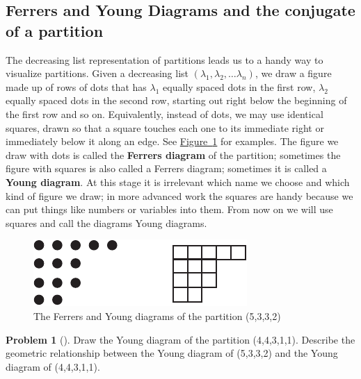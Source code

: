 \documentclass[10pt,]{book}
\newcommand{\terminology}[1]{\textbf{#1}}
\theoremstyle{plain}
\theoremstyle{definition}
\newtheorem{activity}[project]{Problem}
\theoremstyle{definition}
\numberwithin{equation}{chapter}
\begin{document}
\subsection[{Ferrers and Young Diagrams and the conjugate of a partition}]{Ferrers and Young Diagrams and the conjugate of a partition}\label{subsection-38}
The decreasing list representation of partitions leads us to a handy way to visualize partitions. Given a decreasing list \((\lambda_1,\lambda_2,\ldots \lambda_n)\), we draw a figure made up of rows of dots that has \(\lambda_1\) equally spaced dots in the first row, \(\lambda_2\) equally spaced dots in the second row, starting out right below the beginning of the first row and so on. Equivalently, instead of dots, we may use identical squares, drawn so that a square touches each one to its immediate right or immediately below it along an edge. See \hyperref[FerrersYoung]{Figure~\ref{FerrersYoung}} for examples. The figure we draw with dots is called the \terminology{Ferrers diagram} of the partition; sometimes the figure with squares is also called a Ferrers diagram; sometimes it is called a \terminology{Young diagram}. At this stage it is irrelevant which name we choose and which kind of figure we draw; in more advanced work the squares are handy because we can put things like numbers or variables into them.  From now on we will use squares and call the diagrams Young diagrams.%
\begin{figure}
\centering
\includegraphics[width=0.45\linewidth]{images/FerrersYoung}
\caption{The Ferrers and Young diagrams of the partition (5,3,3,2)\label{FerrersYoung}}
\end{figure}
\begin{activity}[] \label{activity-163}
Draw the Young diagram of the partition (4,4,3,1,1). Describe the geometric relationship between the Young diagram of (5,3,3,2) and the Young diagram of (4,4,3,1,1).%
\end{activity}
\end{document}
